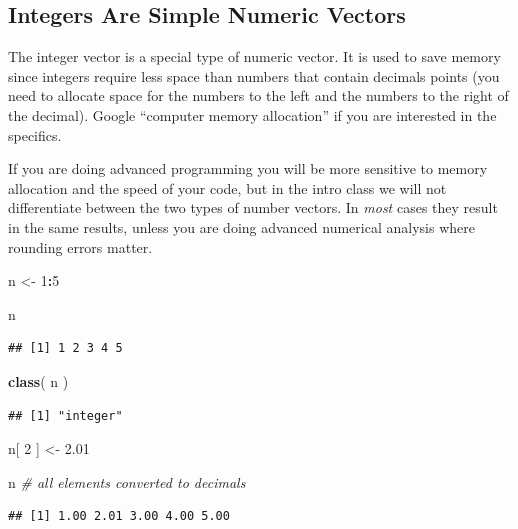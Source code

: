 \documentclass[]{book}
\newenvironment{Shaded}{\begin{snugshade}}{\end{snugshade}}
\newcommand{\CommentTok}[1]{\textcolor[rgb]{0.56,0.35,0.01}{\textit{#1}}}
\newcommand{\DecValTok}[1]{\textcolor[rgb]{0.00,0.00,0.81}{#1}}
\newcommand{\FloatTok}[1]{\textcolor[rgb]{0.00,0.00,0.81}{#1}}
\newcommand{\KeywordTok}[1]{\textcolor[rgb]{0.13,0.29,0.53}{\textbf{#1}}}
\newcommand{\NormalTok}[1]{#1}
\newcommand{\OperatorTok}[1]{\textcolor[rgb]{0.81,0.36,0.00}{\textbf{#1}}}
\newcommand{\StringTok}[1]{\textcolor[rgb]{0.31,0.60,0.02}{#1}}
\theoremstyle{definition}
\theoremstyle{definition}
\theoremstyle{definition}
\theoremstyle{remark}
\begin{document}
\hypertarget{integers-are-simple-numeric-vectors}{%
\subsection{Integers Are Simple Numeric
Vectors}\label{integers-are-simple-numeric-vectors}}

The integer vector is a special type of numeric vector. It is used to
save memory since integers require less space than numbers that contain
decimals points (you need to allocate space for the numbers to the left
and the numbers to the right of the decimal). Google ``computer memory
allocation'' if you are interested in the specifics.

If you are doing advanced programming you will be more sensitive to
memory allocation and the speed of your code, but in the intro class we
will not differentiate between the two types of number vectors. In
\emph{most} cases they result in the same results, unless you are doing
advanced numerical analysis where rounding errors matter.

\begin{Shaded}
\begin{Highlighting}[]
\NormalTok{n <-}\StringTok{ }\DecValTok{1}\OperatorTok{:}\DecValTok{5}

\NormalTok{n}
\end{Highlighting}
\end{Shaded}

\begin{verbatim}
## [1] 1 2 3 4 5
\end{verbatim}

\begin{Shaded}
\begin{Highlighting}[]
\KeywordTok{class}\NormalTok{( n )}
\end{Highlighting}
\end{Shaded}

\begin{verbatim}
## [1] "integer"
\end{verbatim}

\begin{Shaded}
\begin{Highlighting}[]
\NormalTok{n[ }\DecValTok{2}\NormalTok{ ] <-}\StringTok{ }\FloatTok{2.01}

\NormalTok{n  }\CommentTok{# all elements converted to decimals}
\end{Highlighting}
\end{Shaded}

\begin{verbatim}
## [1] 1.00 2.01 3.00 4.00 5.00
\end{verbatim}
\end{document}
